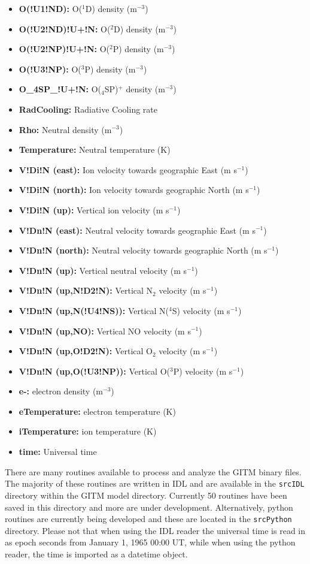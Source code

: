 \begin{itemize}
\item[]{\bf O(!U1!ND):} O($^1$D) density (m$^{-3}$)
\item[]{\bf O(!U2!ND)!U+!N:} O($^2$D) density (m$^{-3}$)
\item[]{\bf O(!U2!NP)!U+!N:} O($^2$P) density (m$^{-3}$)
\item[]{\bf O(!U3!NP):} O($^3$P) density (m$^{-3}$)
\item[]{\bf O\_4SP\_!U+!N:} O($_4$SP)$^+$ density (m$^{-3}$)
\item[]{\bf RadCooling:} Radiative Cooling rate
\item[]{\bf Rho:} Neutral density (m$^{-3}$)
\item[]{\bf Temperature:} Neutral temperature (K)
\item[]{\bf V!Di!N (east):} Ion velocity towards geographic East (m s$^{-1}$)
\item[]{\bf V!Di!N (north):} Ion velocity towards geographic North (m s$^{-1}$) 
\item[]{\bf V!Di!N (up):} Vertical ion velocity (m s$^{-1}$)
\item[]{\bf V!Dn!N (east):} Neutral velocity towards geographic East (m s$^{-1}$)
\item[]{\bf V!Dn!N (north):} Neutral velocity towards geographic North (m s$^{-1}$)
\item[]{\bf V!Dn!N (up):} Vertical neutral velocity (m s$^{-1}$)
\item[]{\bf V!Dn!N (up,N!D2!N):} Vertical N$_2$ velocity (m s$^{-1}$)
\item[]{\bf V!Dn!N (up,N(!U4!NS)):} Vertical N($^4$S) velocity (m s$^{-1}$)
\item[]{\bf V!Dn!N (up,NO):} Vertical NO velocity (m s$^{-1}$)
\item[]{\bf V!Dn!N (up,O!D2!N):} Vertical O$_2$ velocity (m s$^{-1}$)
\item[]{\bf V!Dn!N (up,O(!U3!NP)):} Vertical O($^3$P) velocity (m s$^{-1}$)
\item[]{\bf e-:} electron density (m$^{-3}$)
\item[]{\bf eTemperature:} electron temperature (K)
\item[]{\bf iTemperature:} ion temperature (K)
\item[]{\bf time:} Universal time
\end{itemize}

There are many routines available to process and analyze the GITM binary files.  The majority of these routines are written in IDL and are available in the {\tt srcIDL} directory within the GITM model directory.  Currently 50 routines have been saved in this directory and more are under development.  Alternatively, python routines are currently being developed and these are located in the {\tt srcPython} directory.  Please not that when using the IDL reader the universal time is read in as epoch seconds from January 1, 1965 00:00 UT, while when using the python reader, the time is imported as a datetime object.


